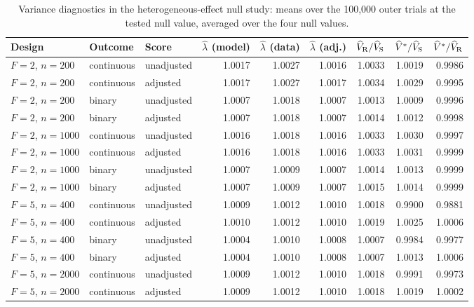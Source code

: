 \documentclass[12pt,a4paper]{article}
\theoremstyle{definition}
\theoremstyle{remark}\newtheorem{remark}{Remark}
\numberwithin{equation}{section}
\begin{document}
\begin{table}[!htbp]\centering
\caption{Variance diagnostics in the heterogeneous-effect null study: means over the 100,000 outer trials at the tested null value, averaged over the four null values.}
\label{tab:supp-hetero-diag}
\begin{threeparttable}\begin{singlespace}\footnotesize\setlength{\tabcolsep}{3pt}
\begin{tabular}{@{}lllrrrrrr@{}}\toprule
Design & Outcome & Score & $\widehat\lambda$ (model) & $\widehat\lambda$ (data) & $\widehat\lambda$ (adj.) & $\widehat V_{\rm R}/\widehat V_{\rm S}$ & $\widehat V^{*}/\widehat V_{\rm S}$ & $\widehat V^{*}/\widehat V_{\rm R}$\\\midrule
$F=2$, $n=200$ & continuous & unadjusted & 1.0017 & 1.0027 & 1.0016 & 1.0033 & 1.0019 & 0.9986\\
$F=2$, $n=200$ & continuous & adjusted & 1.0017 & 1.0027 & 1.0017 & 1.0034 & 1.0029 & 0.9995\\
$F=2$, $n=200$ & binary & unadjusted & 1.0007 & 1.0018 & 1.0007 & 1.0013 & 1.0009 & 0.9996\\
$F=2$, $n=200$ & binary & adjusted & 1.0007 & 1.0018 & 1.0007 & 1.0014 & 1.0012 & 0.9998\\
$F=2$, $n=1000$ & continuous & unadjusted & 1.0016 & 1.0018 & 1.0016 & 1.0033 & 1.0030 & 0.9997\\
$F=2$, $n=1000$ & continuous & adjusted & 1.0016 & 1.0018 & 1.0016 & 1.0033 & 1.0031 & 0.9999\\
$F=2$, $n=1000$ & binary & unadjusted & 1.0007 & 1.0009 & 1.0007 & 1.0014 & 1.0013 & 0.9999\\
$F=2$, $n=1000$ & binary & adjusted & 1.0007 & 1.0009 & 1.0007 & 1.0015 & 1.0014 & 0.9999\\
$F=5$, $n=400$ & continuous & unadjusted & 1.0009 & 1.0012 & 1.0010 & 1.0018 & 0.9900 & 0.9881\\
$F=5$, $n=400$ & continuous & adjusted & 1.0010 & 1.0012 & 1.0010 & 1.0019 & 1.0025 & 1.0006\\
$F=5$, $n=400$ & binary & unadjusted & 1.0004 & 1.0010 & 1.0008 & 1.0007 & 0.9984 & 0.9977\\
$F=5$, $n=400$ & binary & adjusted & 1.0004 & 1.0010 & 1.0008 & 1.0007 & 1.0013 & 1.0006\\
$F=5$, $n=2000$ & continuous & unadjusted & 1.0009 & 1.0012 & 1.0010 & 1.0018 & 0.9991 & 0.9973\\
$F=5$, $n=2000$ & continuous & adjusted & 1.0009 & 1.0012 & 1.0010 & 1.0018 & 1.0019 & 1.0002\\

\end{tabular}
\end{singlespace}
\end{threeparttable}
\end{table}
\end{document}
